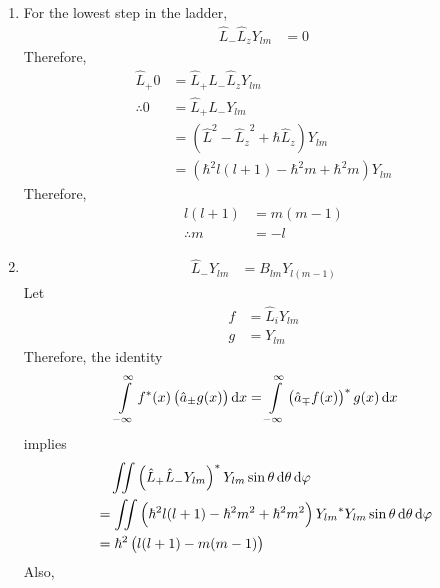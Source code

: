 \documentclass[fleqn, a4paper, 11pt, oneside]{amsart}
\theoremstyle{definition}
\theoremstyle{theorem}
\begin{document}
\begin{solution}
	\begin{enumerate}[leftmargin=*]
		\item
			For the lowest step in the ladder,
			\begin{align*}
				\hat{L}_- \hat{L}_z Y_{l m} & = 0
			\end{align*}
			Therefore,
			\begin{align*}
				\hat{L}_+ 0  & = \hat{L}_+ \hat{L}_- \hat{L}_z Y_{l m}                              \\
				\therefore 0 & = \hat{L}_+ \hat{L}_- Y_{l m}                                        \\
                                             & = \left( \hat{L}^2 - {\hat{L}_z}^2 + \hbar \hat{L}_z \right) Y_{l m} \\
                                             & = \left( \hbar^2 l (l + 1) - \hbar^2 m + \hbar^2 m \right) Y_{l m}
			\end{align*}
			Therefore,
			\begin{align*}
				l (l + 1)    & = m (m - 1) \\
				\therefore m & = -l
			\end{align*}
		\item
			\begin{align*}
				\hat{L}_- Y_{l m} & = B_{l m} Y_{l (m - 1)}
			\end{align*}
			Let
			\begin{align*}
				f & = \hat{L}_i Y_{l m} \\
				g & = Y_{l m}
			\end{align*}
			Therefore, the identity
			\begin{align*}
				\int\limits_{-\infty}^{\infty} f^*(x) \left( \hat{a}_{\pm} g(x) \right) \dif x & = \int\limits_{-\infty}^{\infty} \left( \hat{a}_{\mp} f(x) \right)^* g(x) \dif x
			\end{align*}
			implies
			\begin{align*}
                                & \quad \iint \left( \hat{L}_+ \hat{L}_- Y_{l m} \right)^* Y_{l m} \sin \theta \dif \theta \dif \varphi                         \\
                                & = \iint \left( \hbar^2 l (l + 1) - \hbar^2 m^2 + \hbar^2 m^2 \right) {Y_{l m}}^* Y_{l m} \sin \theta \dif \theta \dif \varphi \\
                                & = \hbar^2 \left( l (l + 1) - m (m - 1) \right)
			\end{align*}
			Also,

\end{enumerate}
\end{solution}
\end{document}
